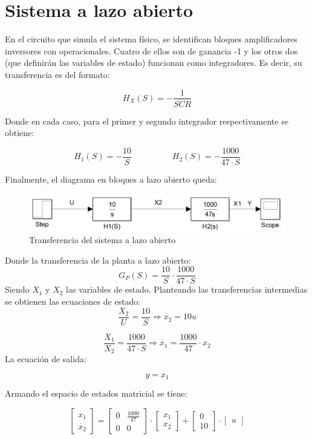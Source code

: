 \documentclass{article}
\begin{document}
\newgeometry{} %



\tableofcontents
\newpage

\section{Sistema a lazo abierto}

En el circuito que simula el sistema físico, se identifican bloques amplificadores inversores con operacionales. Cuatro de ellos son de ganancia -1 y los otros dos (que definirán las variables de estado) funcionan como integradores. Es decir, su transferencia es del formato:

\[
H_X(S) = -\frac{1}{SCR}
\]

Donde en cada caso, para el primer y segundo integrador respectivamente se obtiene:

\[
H_1(S) = -\frac{10}{S} \hspace{2cm} H_2(S) = -\frac{1000}{47 \cdot S}
\]

Finalmente, el diagrama en bloques a lazo abierto queda:

\begin{figure}[H]
\centering
\includegraphics[width=0.7\linewidth]{Imagenes/HLazoAbierto.png}
\caption{Transferencia del sistema a lazo abierto}
\label{fig:Circuito}
\end{figure}

Donde la transferencia de la planta a lazo abierto:
\[
G_P(S) = \frac{10}{S} \cdot \frac{1000}{47 \cdot S}
\]
Siendo $X_1$ y $X_2$ las variables de estado. Planteando las transferencias intermedias se obtienen las ecuaciones de estado:
\[
\frac{X_2}{U} = \frac{10}{S} \Longrightarrow \dot{x_2} = 10u
\]

\[
\frac{X_1}{X_2} = \frac{1000}{47 \cdot S} \Longrightarrow \dot{x_1} = \frac{1000}{47} \cdot x_2
\]
La ecuación de salida:

\[
y = x_1
\]

Armando el espacio de estados matricial se tiene:

\[
\begin{bmatrix}
\dot{x_1} \\
\dot{x_2} 
\end{bmatrix}
=
\begin{bmatrix}
0 & \frac{1000}{47} \\
0 & 0 
\end{bmatrix}
\cdot
\begin{bmatrix}
x_1 \\
x_2 
\end{bmatrix}
+
\begin{bmatrix}
0 \\
10 
\end{bmatrix}
\cdot
\begin{bmatrix}
u
\end{bmatrix}
\]
\end{document}
